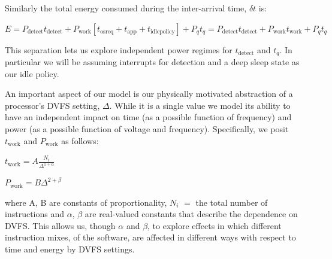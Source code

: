 

Similarly the total energy consumed during the inter-arrival time, $\delta t$ is:

$\boxed{E = P_\text{detect} t_{\text{detect}} + P_{\text{work}} \left[t_{\text{osreq}} + t_{\text{app}} + t_{\text{idlepolicy}}\right] + P_q t_q} = P_\text{detect} t_{\text{detect}} + P_{\text{work}} t_{\text{work}} + P_q t_q$

This separation lets us explore independent power regimes for $t_{\text{detect}}$ and $t_q$.  In particular we will be assuming interrupts for detection and a deep sleep state as our idle policy.    

An important aspect of our model is our physically motivated abstraction of a processor's DVFS setting, $\Delta$.  While it is a single value we model its ability to have an independent impact on time (as a possible function of frequency) and power (as a possible function of voltage and frequency).  Specifically, we posit 
$t_{\text{work}}$ and $P_{\text{work}}$ as follows:

$t_{\text{work}} = A\frac{N_i}{\Delta^{1+\alpha}}$

$P_{\text{work}} = B \Delta^{2+\beta}$

where A, B are constants of proportionality, $N_i$ $=$ the total number of instructions and $\alpha$, $\beta$ are real-valued constants that describe the dependence on DVFS.  This allows us, though $\alpha$ and $\beta$, to explore effects in which different instruction mixes, of the software, are affected in different ways with respect to time and energy by DVFS settings.  



